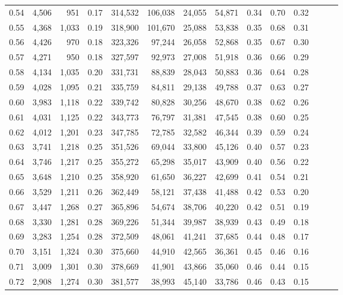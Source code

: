 \begin{tabular}{rrrrrrrrrrrrrr}
0.54 &  4,506 &    951 &  0.17 &  314,532 &  106,038 &  24,055 &  54,871 &  0.34 &  0.70 &      0.32 \\
0.55 &  4,368 &  1,033 &  0.19 &  318,900 &  101,670 &  25,088 &  53,838 &  0.35 &  0.68 &      0.31 \\
0.56 &  4,426 &    970 &  0.18 &  323,326 &   97,244 &  26,058 &  52,868 &  0.35 &  0.67 &      0.30 \\
0.57 &  4,271 &    950 &  0.18 &  327,597 &   92,973 &  27,008 &  51,918 &  0.36 &  0.66 &      0.29 \\
0.58 &  4,134 &  1,035 &  0.20 &  331,731 &   88,839 &  28,043 &  50,883 &  0.36 &  0.64 &      0.28 \\
0.59 &  4,028 &  1,095 &  0.21 &  335,759 &   84,811 &  29,138 &  49,788 &  0.37 &  0.63 &      0.27 \\
0.60 &  3,983 &  1,118 &  0.22 &  339,742 &   80,828 &  30,256 &  48,670 &  0.38 &  0.62 &      0.26 \\
0.61 &  4,031 &  1,125 &  0.22 &  343,773 &   76,797 &  31,381 &  47,545 &  0.38 &  0.60 &      0.25 \\
0.62 &  4,012 &  1,201 &  0.23 &  347,785 &   72,785 &  32,582 &  46,344 &  0.39 &  0.59 &      0.24 \\
0.63 &  3,741 &  1,218 &  0.25 &  351,526 &   69,044 &  33,800 &  45,126 &  0.40 &  0.57 &      0.23 \\
0.64 &  3,746 &  1,217 &  0.25 &  355,272 &   65,298 &  35,017 &  43,909 &  0.40 &  0.56 &      0.22 \\
0.65 &  3,648 &  1,210 &  0.25 &  358,920 &   61,650 &  36,227 &  42,699 &  0.41 &  0.54 &      0.21 \\
0.66 &  3,529 &  1,211 &  0.26 &  362,449 &   58,121 &  37,438 &  41,488 &  0.42 &  0.53 &      0.20 \\
0.67 &  3,447 &  1,268 &  0.27 &  365,896 &   54,674 &  38,706 &  40,220 &  0.42 &  0.51 &      0.19 \\
0.68 &  3,330 &  1,281 &  0.28 &  369,226 &   51,344 &  39,987 &  38,939 &  0.43 &  0.49 &      0.18 \\
0.69 &  3,283 &  1,254 &  0.28 &  372,509 &   48,061 &  41,241 &  37,685 &  0.44 &  0.48 &      0.17 \\
0.70 &  3,151 &  1,324 &  0.30 &  375,660 &   44,910 &  42,565 &  36,361 &  0.45 &  0.46 &      0.16 \\
0.71 &  3,009 &  1,301 &  0.30 &  378,669 &   41,901 &  43,866 &  35,060 &  0.46 &  0.44 &      0.15 \\
0.72 &  2,908 &  1,274 &  0.30 &  381,577 &   38,993 &  45,140 &  33,786 &  0.46 &  0.43 &      0.15 \\

\end{tabular}

